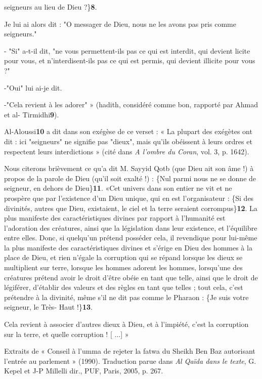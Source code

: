 seigneurs au lieu de Dieu ?\}\textbf{8}.

Je lui ai alors dit : "O messager de Dieu, nous ne les avons pas pris
comme seigneurs."

- "Si" a-t-il dit, "ne vous permettent-ils pas ce qui est interdit, qui
devient licite pour vous, et n'interdisent-ils pas ce qui est permis,
qui devient illicite pour vous ?"

-"Oui" lui ai-je dit.

-"Cela revient à les adorer" » (hadith, considéré comme bon, rapporté
par Ahmad et al- Tirmidhi\textbf{9}).

Al-Aloussi\textbf{10} a dit dans son exégèse de ce verset : « La plupart
des exégètes ont dit : ici "seigneurs" ne signifie pas "dieux", mais
qu'ils obéissent à leurs ordres et respectent leurs interdictions »
(cité dans \emph{A l'ombre du Coran}, vol. 3, p. 1642).

Nous citerons brièvement ce qu'a dit M. Sayyid Qotb (que Dieu ait son
âme !) à propos de la parole de Dieu (qu'il soit exalté !) : \{Nul parmi
nous ne se donne de seigneur, en dehors de Dieu\}\textbf{11}. «Cet
univers dans son entier ne vit et ne prospère que par l'existence d'un
Dieu unique, qui en est l'organisateur : \{Si des divinités, autres que
Dieu, existaient, le ciel et la terre seraient corrompus\}\textbf{12}.
La plus manifeste des caractéristiques divines par rapport à l'humanité
est l'adoration des créatures, ainsi que la législation dans leur
existence, et l'équilibre entre elles. Donc, si quelqu'un prétend
posséder cela, il revendique pour lui-même la plus manifeste des
caractéristiques divines et s'érige en Dieu des hommes à la place de
Dieu, et rien n'égale la corruption qui se répand lorsque les dieux se
multiplient sur terre, lorsque les hommes adorent les hommes, lorsqu'une
des créatures prétend avoir le droit d'être obéie en tant que telle,
ainsi que le droit de légiférer, d'établir des valeurs et des règles en
tant que telles ; tout cela, c'est prétendre à la divinité, même s'il ne
dit pas comme le Pharaon : \{Je suis votre seigneur, le Très- Haut
!\}\textbf{13}.

Cela revient à associer d'autres dieux à Dieu, et à l'impiété, c'est la
corruption sur la terre, et quelle corruption ! {[} ...{]} »

Extraits de « Conseil à l'umma de rejeter la fatwa du Sheikh Ben Baz
autorisant l'entrée au parlement » (1990). Traduction parue dans
\emph{Al Qaïda dans le texte}, G. Kepel et J-P Millelli dir., PUF,
Paris, 2005, p. 267.
 
 
